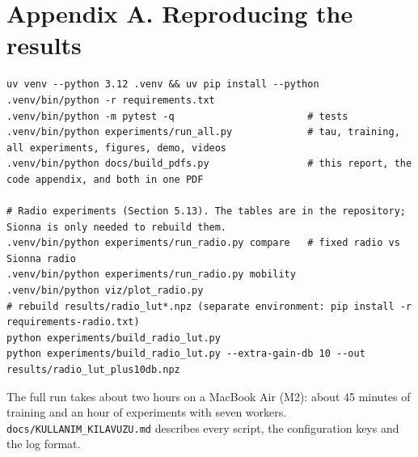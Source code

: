 \documentclass[journal]{IEEEtran}
\begin{document}
\section*{Appendix A. Reproducing the results}
\begin{lstlisting}
uv venv --python 3.12 .venv && uv pip install --python .venv/bin/python -r requirements.txt
.venv/bin/python -m pytest -q                       # tests
.venv/bin/python experiments/run_all.py             # tau, training, all experiments, figures, demo, videos
.venv/bin/python docs/build_pdfs.py                 # this report, the code appendix, and both in one PDF

# Radio experiments (Section 5.13). The tables are in the repository; Sionna is only needed to rebuild them.
.venv/bin/python experiments/run_radio.py compare   # fixed radio vs Sionna radio
.venv/bin/python experiments/run_radio.py mobility
.venv/bin/python viz/plot_radio.py
# rebuild results/radio_lut*.npz (separate environment: pip install -r requirements-radio.txt)
python experiments/build_radio_lut.py
python experiments/build_radio_lut.py --extra-gain-db 10 --out results/radio_lut_plus10db.npz
\end{lstlisting}

The full run takes about two hours on a MacBook Air (M2): about 45 minutes of training and an hour of experiments with seven workers. \texttt{docs/\allowbreak KULLANIM\_\allowbreak KILAVUZU.md} describes every script, the configuration keys and the log format.
\end{document}
